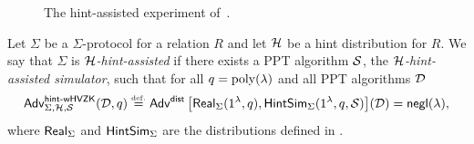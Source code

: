 \begin{figure}[htb]
    \centering
    \begin{pchstack}
        \pchspace
    \end{pchstack}
    \caption{The hint-assisted \wHVZK experiment of~\cite[Experiment~2]{C:ABDPW25}.}
    \label{fig:hint-hvzk}
\end{figure}

\begin{definition}\label{def:hint-hvzk}
    Let $\Sigma$ be a $\Sigma$-protocol for a relation $R$ and let $\mathcal{H}$
    be a hint distribution for $R$.
    We say that $\Sigma$ is \emph{$\mathcal{H}$-hint-assisted \wHVZK} if there
    exists a PPT algorithm $\operatorname{\mathcal{S}}$, the \emph{$\mathcal{H}$-hint-assisted
    simulator}, such that for all $q = \operatorname{poly}(\lambda)$ and all PPT
    algorithms $\mathcal{D}$
    \begin{equation}
        \hinthvzkadv{\Sigma}{\hintdistr}{\Sim}{\ddv, \hintnum} \defeq
        \distadv{\Real_\Sigma(1^\secp, \hintnum)}%
                {\HintSim_\Sigma(1^\secp, \hintnum, \Sim)}{\ddv}
        = \negl(\secp),
    \end{equation}
    where $\mathsf{Real}_\Sigma$ and $\mathsf{HintSim}_\Sigma$ are the distributions defined in
    .
\end{definition}

